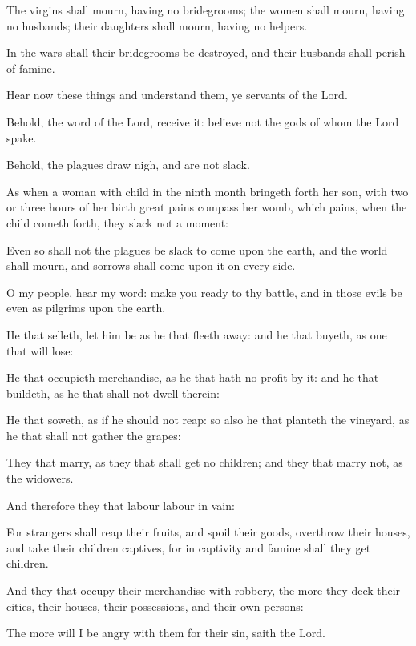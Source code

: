 {\par }{\PP {}The virgins shall mourn, having no bridegrooms; the women shall mourn, having no husbands; their daughters shall mourn, having no helpers.
\par }{\PP {}In the wars shall their bridegrooms be destroyed, and their husbands shall perish of famine.
\par }{\PP {}Hear now these things and understand them, ye servants of the Lord.
\par }{\PP {}Behold, the word of the Lord, receive it: believe not the gods of whom the Lord spake.
\par }{\PP {}Behold, the plagues draw nigh, and are not slack.
\par }{\PP {}As when a woman with child in the ninth month bringeth forth her son, with two or three hours of her birth great pains compass her womb, which pains, when the child cometh forth, they slack not a moment:
\par }{\PP {}Even so shall not the plagues be slack to come upon the earth, and the world shall mourn, and sorrows shall come upon it on every side.
\par }{\PP {}O my people, hear my word: make you ready to thy battle, and in those evils be even as pilgrims upon the earth.
\par }{\PP {}He that selleth, let him be as he that fleeth away: and he that buyeth, as one that will lose:
\par }{\PP {}He that occupieth merchandise, as he that hath no profit by it: and he that buildeth, as he that shall not dwell therein:
\par }{\PP {}He that soweth, as if he should not reap: so also he that planteth the vineyard, as he that shall not gather the grapes:
\par }{\PP {}They that marry, as they that shall get no children; and they that marry not, as the widowers.
\par }{\PP {}And therefore they that labour labour in vain:
\par }{\PP {}For strangers shall reap their fruits, and spoil their goods, overthrow their houses, and take their children captives, for in captivity and famine shall they get children.
\par }{\PP {}And they that occupy their merchandise with robbery, the more they deck their cities, their houses, their possessions, and their own persons:
\par }{\PP {}The more will I be angry with them for their sin, saith the Lord.
}
